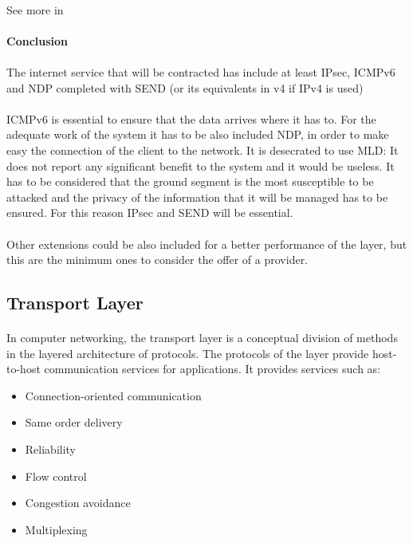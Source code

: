 \paragraph{}
See more in \cite{MLD}


\paragraph{} \textbf{Conclusion}
\paragraph{}
The internet service that will be contracted has include at least IPsec, ICMPv6 and NDP completed with SEND (or its equivalents in v4 if IPv4 is used)
\paragraph{} 
ICMPv6 is essential to ensure that the data arrives where it has to. For the adequate work of the system it has to be also included  NDP, in order to make easy the connection of the client to the network. It is desecrated to use MLD: It does not report any significant benefit to the system and it would be useless. It has to be considered that the ground segment is the most susceptible to be attacked and the privacy of the information that it will be managed has to be ensured. For this reason IPsec and SEND will be essential.
\paragraph{}
Other extensions could be also included for a better performance of the layer, but this are the minimum ones to consider the offer of a provider.

\subsection{Transport Layer}
\paragraph{}
In computer networking, the transport layer is a conceptual division of methods in the layered architecture of protocols.  The protocols of the layer provide host-to-host communication services for applications. It provides services such as:
\begin{itemize}
\item Connection-oriented communication
\item Same order delivery
\item Reliability
\item Flow control
\item Congestion avoidance
\item Multiplexing
\end{itemize}
